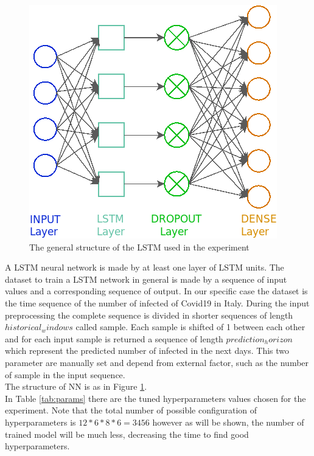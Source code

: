 \documentclass[letterpaper]{article}%
\begin{document}
\begin{figure}[!h]
	\includegraphics[width=\columnwidth]{img/LSTM}
	\caption{The general structure of the LSTM used in the experiment}
	\label{fig:LSTM}
\end{figure}
A LSTM neural network is made by at least one layer of LSTM units. The dataset to train a LSTM network in general is made by a sequence of input values and a corresponding sequence of output.
In our specific case the dataset is the time sequence of the number of infected of Covid19 in Italy. During the input preprocessing the complete sequence is divided in shorter sequences of length $ historical_windows $ called sample. Each sample is shifted of 1 between each other and for each input sample is returned a sequence of length $ prediction_horizon $ which represent the predicted number of infected in the next days. This two parameter are manually set and depend from external factor, such as the number of sample in the input sequence. \\ The structure of NN is as in Figure \ref{fig:LSTM}.\\ 
In Table \ref{tab:params} there are the tuned hyperparameters values chosen for the experiment. Note that the total number of possible configuration of hyperparameters is $ 12*6*8*6 = 3456 $ however as will be shown, the number of trained model will be much less, decreasing the time to find good hyperparameters.\\
\end{document}
